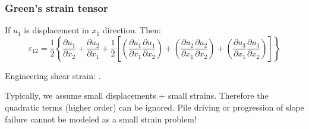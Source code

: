 \documentclass[notes]{beamer}
\begin{document}
\begin{frame}
\frametitle{Green's strain tensor}
If $u_1$ is displacement in $x_1$ direction. Then:
\begin{equation*}
\varepsilon_{12} = \frac{1}{2}\left\{\frac{\partial u_1}{\partial x_2} + \frac{\partial u_2}{\partial x_1} + \frac{1}{2} \left[\left(\frac{\partial u_1}{\partial x_1}\frac{\partial u_1}{\partial x_2}\right) +
\left(\frac{\partial u_2}{\partial x_1}\frac{\partial u_2}{\partial x_2}\right) + \left(\frac{\partial u_3}{\partial x_1}\frac{\partial u_3}{\partial x_2}\right)\right]\right\}
\end{equation*}

Engineering shear strain: .

Typically, we assume small displacements + small strains. Therefore the quadratic terms (higher order) can be ignored. Pile driving or progression of slope failure cannot be modeled as a small strain problem!
\end{frame}
\end{document}
